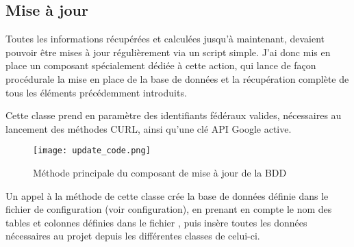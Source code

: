\subsection{Mise à jour}
\vspace{1cm}

Toutes les informations récupérées et calculées jusqu’à maintenant, devaient pouvoir être mises à jour régulièrement via un script simple. J’ai donc mis en place un composant spécialement dédiée à cette action, qui lance de façon procédurale la mise en place de la base de données et la récupération complète de tous les éléments précédemment introduits.

Cette classe prend en paramètre des identifiants fédéraux valides, nécessaires au lancement des méthodes CURL, ainsi qu’une clé API Google active.

\begin{figure}[!h]
    \centering
    \texttt{[image: update\_code.png]}
    \caption{Méthode principale du composant de mise à jour de la BDD}
\end{figure}

Un appel à la méthode  de cette classe crée la base de données définie dans le fichier de configuration  (voir configuration), en prenant en compte le nom des tables et colonnes définies dans le fichier , puis insère toutes les données nécessaires au projet depuis les différentes classes de celui-ci.